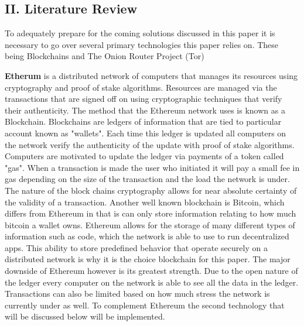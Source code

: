 \documentclass{article}
\begin{document}
\begin{center}
	\section*{II. Literature Review}
\end{center}

To adequately prepare for the coming solutions discussed in this paper it is necessary to go over several primary technologies this paper relies on. 
These being Blockchains and The Onion Router Project (Tor)

\textbf{Etherum} is a distributed network of computers that manages its resources using cryptography and proof of stake algorithms. 
Resources are managed via the transactions that are signed off on using cryptographic techniques that verify their authenticity. 
The method that the Ethereum network uses is known as a Blockchain. 
Blockchains are ledgers of information that are tied to particular account known as "wallets". 
Each time this ledger is updated all computers on the network verify the authenticity of the update with proof of stake algorithms. 
Computers are motivated to update the ledger via payments of a token called "gas". 
When a transaction is made the user who initiated it will pay a small fee in gas depending on the size of the transaction and the load the network is under. 
The nature of the block chains cryptography allows for near absolute certainty of the validity of a transaction. 
Another well known blockchain is Bitcoin, which differs from Ethereum in that is can only store information relating to how much bitcoin a wallet owns. 
Ethereum allows for the storage of many different types of information such as code, which the network is able to use to run decentralized apps. 
This ability to store predefined behavior that operate securely on a distributed network is why it is the choice blockchain for this paper. 
The major downside of Ethereum however is its greatest strength. 
Due to the open nature of the ledger every computer on the network is able to see all the data in the ledger. 
Transactions can also be limited based on how much stress the network is currently under as well. 
To complement Ethereum the second technology that will be discussed below will be implemented.
\end{document}
